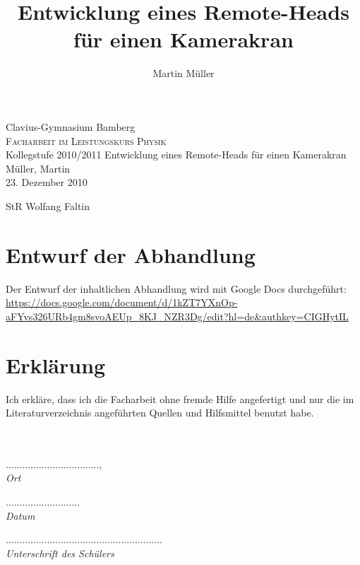 \documentclass[a4paper, 12pt, bibtotocnumbered, liststotocnumbered]{scrartcl}
\begin{document}
	\title{Entwicklung eines Remote-Heads für einen Kamerakran}
	\author{Martin Müller}

	\thispagestyle{empty}
	\begin{center}
		\large{Clavius-Gymnasium Bamberg}\\
		\Large\textsc{Facharbeit im Leistungskurs Physik}\\
		\large{Kollegstufe 2010/2011}
		\vfill
		{\Huge Entwicklung eines Remote-Heads für einen Kamerakran}
		\vfill
		\hfill{Müller, Martin}\\
		\hfill\small{23. Dezember 2010}\\
	\end{center}
	StR Wolfang Faltin

	\pagebreak

	\thispagestyle{empty}
	\tableofcontents

	\pagebreak

	\section{Entwurf der Abhandlung}
	Der Entwurf der inhaltlichen Abhandlung wird mit Google Docs durchgeführt:\\
	\url{https://docs.google.com/document/d/1kZT7YXnOp-aFYvs326URb4gm8svoAEUp_8KJ_NZR3Dg/edit?hl=de&authkey=CIGHytIL}

	\pagebreak

	\nocite{*}
	
	

	\listoffigures

	\pagebreak

	\section*{Erklärung}
	Ich erkläre, dass ich die Facharbeit ohne fremde Hilfe angefertigt und nur die im Literaturverzeichnis angeführten Quellen und Hilfsmittel benutzt habe.\\
	\\
	\\
	\begin{minipage}{3cm}
		..................................,\\
		\it{Ort}
	\end{minipage}
	\hspace{1.5cm}
	\begin{minipage}{2cm}
		...........................\\
		\it{Datum}
	\end{minipage}
	\hspace{1.5cm}
	\begin{minipage}{8cm}
		.........................................................\\
		\it{Unterschrift des Schülers}
	\end{minipage}
\end{document}

